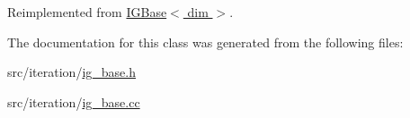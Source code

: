 Reimplemented from \hyperlink{class_i_g_base_abd1edeb3ca2076fcb087abc658a09f30}{I\+G\+Base$<$ dim $>$}.



The documentation for this class was generated from the following files\+:\begin{DoxyCompactItemize}
\item 
src/iteration/\hyperlink{ig__base_8h}{ig\+\_\+base.\+h}\item 
src/iteration/\hyperlink{ig__base_8cc}{ig\+\_\+base.\+cc}\end{DoxyCompactItemize}
